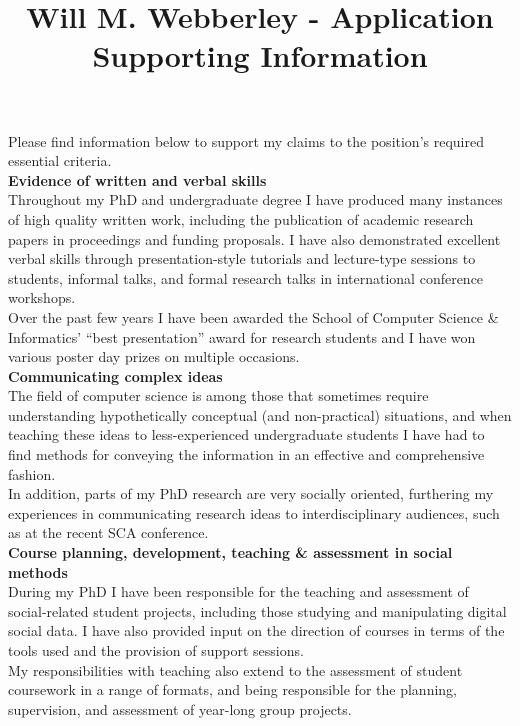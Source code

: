 \documentclass[11pt,a4paper]{article}
\title{Will M. Webberley - Application Supporting Information}
\date{}
\begin{document}
\maketitle
Please find information below to support my claims to the position's required essential criteria.\\

\textbf{Evidence of written and verbal skills}\\
Throughout my PhD and undergraduate degree I have produced many instances of high quality written work, including the publication of academic research papers in proceedings and funding proposals. I have also demonstrated excellent verbal skills through presentation-style tutorials and lecture-type sessions to students, informal talks, and formal research talks in international conference workshops.\\
Over the past few years I have been awarded the School of Computer Science \& Informatics' ``best presentation'' award for research students and I have won various poster day prizes on multiple occasions.\\

\textbf{Communicating complex ideas}\\
The field of computer science is among those that sometimes require understanding hypothetically conceptual (and non-practical) situations, and when teaching these ideas to less-experienced undergraduate students I have had to find methods for conveying the information in an effective and comprehensive fashion.\\
In addition, parts of my PhD research are very socially oriented, furthering my experiences in communicating research ideas to interdisciplinary audiences, such as at the recent SCA conference.\\

\textbf{Course planning, development, teaching \& assessment in social methods}\\
During my PhD I have been responsible for the teaching and assessment of social-related student projects, including those studying and manipulating digital social data. I have also provided input on the direction of courses in terms of the tools used and the provision of support sessions.\\
My responsibilities with teaching also extend to the assessment of student coursework in a range of formats, and being responsible for the planning, supervision, and assessment of year-long group projects.\\
\end{document}
